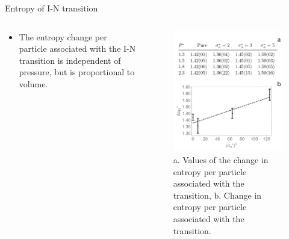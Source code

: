 \documentclass{beamer}
\begin{document}
\begin{frame}{Entropy of I-N transition}
    \begin{columns}
        \begin{column}{0.5\textwidth}
        \begin{itemize}
            \item The entropy change per particle associated with the I-N transition is independent of pressure, but is proportional to volume.
        \end{itemize}
        \end{column}
        
        \begin{column}{0.5\textwidth}
        \begin{figure}
            \centering
            \includegraphics[scale = 0.22]{Figures/Entropy.png}
            \caption{{\scriptsize a. Values of the change in entropy per particle associated with the transition, b. Change in entropy per particle associated with the transition.}}
            \label{fig:enter-label}
        \end{figure}
        \end{column}
    \end{columns}
\end{frame}
\end{document}
